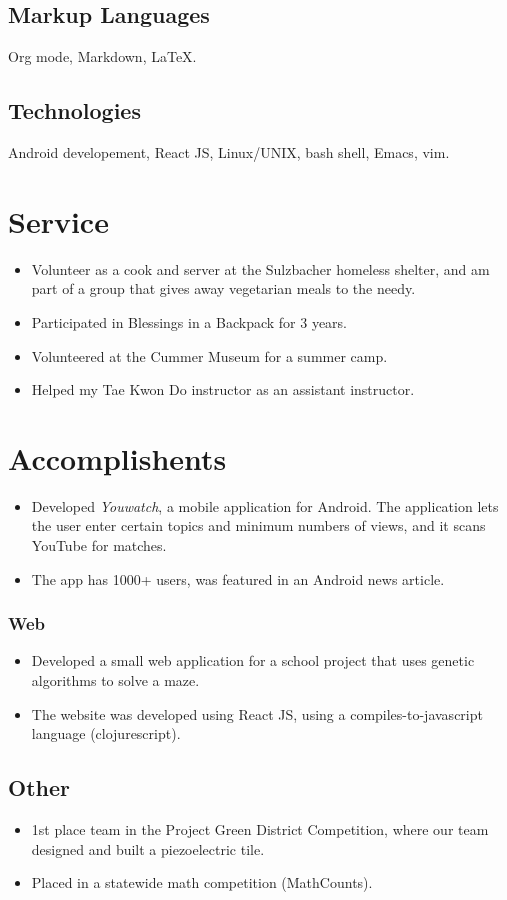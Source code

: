 \documentclass[12pt, noindent]{article}
\begin{document}
\subsection{Markup Languages}
Org mode, Markdown, \LaTeX{}.

\subsection{Technologies}
Android developement, React JS, Linux/UNIX, bash shell, Emacs, vim. 

\section{Service}
\begin{itemize}
\item Volunteer as a cook and server at the Sulzbacher homeless shelter, and am
  part of a group that gives away vegetarian meals to the needy.
\item Participated in Blessings in a Backpack for 3 years.
\item Volunteered at the Cummer Museum for a summer camp.
\item Helped my Tae Kwon Do instructor as an assistant instructor.
\end{itemize}

\section{Accomplishents}
\begin{itemize}
\item Developed \textit{Youwatch}, a mobile application for Android. The
  application lets the user enter certain topics and minimum numbers of views,
  and it scans YouTube for matches.
\item The app has 1000+ users, was featured in an Android news article. 
\end{itemize}

\subsubsection{Web}
\begin{itemize}
\item Developed a small web application for a school project that uses genetic
  algorithms to solve a maze.  
\item The website was developed using React JS, using a compiles-to-javascript
  language (clojurescript). 
\end{itemize}

\subsection{Other}
\begin{itemize}
\item 1st place team in the Project Green District Competition, where our team
  designed and built a piezoelectric tile.
\item Placed in a statewide math competition (MathCounts).
\end{itemize}
\end{document}
